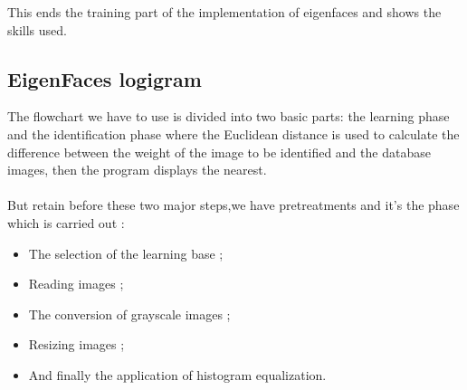 This ends the training part of the implementation of eigenfaces and shows the skills used.



\subsection{EigenFaces logigram }

The flowchart we  have to use is  divided into two basic parts: the learning phase and the identification phase where the Euclidean distance is used to calculate the difference between the weight of the image to be identified and the database images, then the program displays the nearest.
\paragraph{}
But retain before these two major steps,we have  pretreatments and it’s the phase which is carried out :
\begin{itemize}
\item The selection of the learning base ;
\item Reading images ;
\item The conversion of grayscale images ;
\item Resizing images ;
\item And finally the application of histogram equalization.
\end{itemize}



